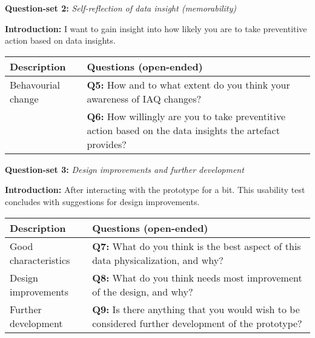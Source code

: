 \begin{appendices}
\vspace{-10pt}

\begin{table}[htbp]
    \captionsetup{justification=raggedright,singlelinecheck=false}
    \raggedright \textbf{Question-set 2:} \textit{Self-reflection of data insight (memorability)} \\
    \raggedright \textbf{Introduction:} I want to gain insight into how likely you are to take preventitive action based on data insights.
    \label{tab:column_widths}
    \begin{tabularx}{\textwidth}{|p{}|X|}
        \hline
        \textbf{Description} & \textbf{Questions (open-ended)} \\
        \hline
        Behavourial change & 
        \textbf{Q5:} How and to what extent do you think your awareness of IAQ changes? \\
        & \textbf{Q6:} How willingly are you to take preventitive action based on the data insights the artefact provides? \\
        \hline
    \end{tabularx}
\end{table}

\vspace{-10pt}


\begin{table}[htbp]
    \captionsetup{justification=raggedright,singlelinecheck=false}
    \raggedright \textbf{Question-set 3:} \textit{Design improvements and further development} \\
    \raggedright \textbf{Introduction:} After interacting with the prototype for a bit. This usability test concludes with suggestions for design improvements.
    \label{tab:column_widths}
    \begin{tabularx}{\textwidth}{|p{}|X|}
        \hline
        \textbf{Description} & \textbf{Questions (open-ended)} \\
        \hline
        Good characteristics & \textbf{Q7:} What do you think is the best aspect of this data physicalization, and why? \\
        \hline
        Design improvements & \textbf{Q8:} What do you think needs most improvement of the design, and why? \\
        \hline
        Further development & \textbf{Q9:} Is there anything that you would wish to be considered further development of the prototype? \\
        \hline
    \end{tabularx}
\end{table}


\end{appendices}
